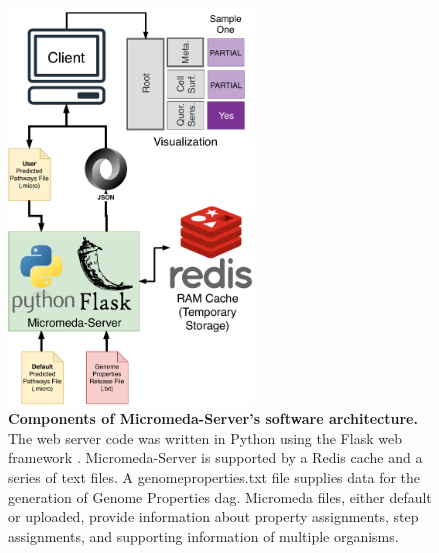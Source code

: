 \begin{figure}[!ht]
  \centering
	\includegraphics[width=0.58\textwidth]{media/Micromeda-Server.pdf}
	 \caption[Components of Micromeda-Server's software 
architecture.]{\textbf{Components of Micromeda-Server's software architecture.} 
The web server code was written in Python using the Flask web framework 
\cite{grinberg2018flask}. Micromeda-Server is supported by a Redis cache and a 
series of text files. A genomeproperties.txt file supplies data for the 
generation of Genome Properties \gls{dag}. Micromeda files, either default or 
uploaded, provide information about property assignments, step assignments, and 
supporting information of multiple organisms.}
	 \label{fig:micromeda-server}
\end{figure}

